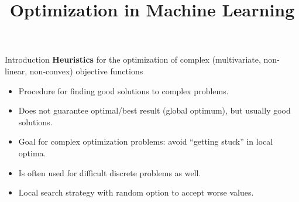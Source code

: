 \documentclass[11pt,compress,t,notes=noshow, xcolor=table]{beamer}
\title{Optimization in Machine Learning}
\date{}
\begin{document}
\lecture{\inserttitle}
\sloppy

\begin{vbframe}{Introduction}
\textbf{Heuristics} for the optimization of complex (multivariate, non-linear, non-convex) objective functions \\
\lz

\begin{itemize}
\item Procedure for finding good solutions to complex problems.
\item Does not guarantee optimal/best result (global optimum), but usually good solutions.
\item Goal for complex optimization problems: avoid \enquote{getting stuck} in local optima.
\item Is often used for difficult discrete problems as well.
\item Local search strategy with random option to accept worse values.
\end{itemize}

\end{vbframe}
\end{document}
